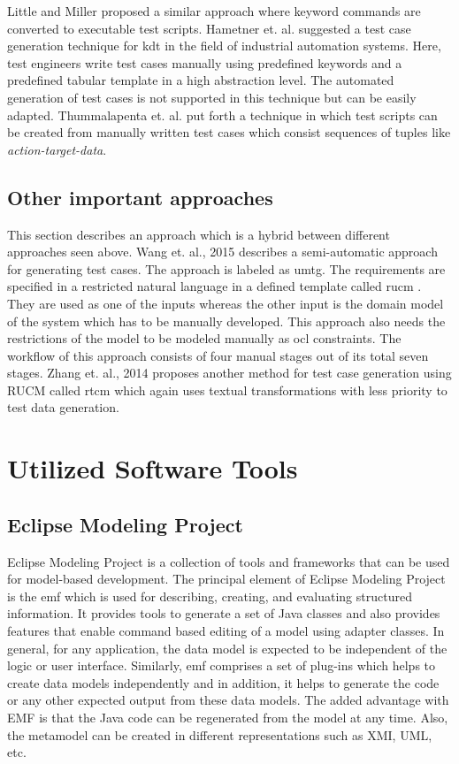 Little and Miller \cite{little2006translating} proposed a similar approach where keyword commands are converted to executable test scripts. Hametner et. al. \cite{hametner2012agile} suggested a test case generation technique for \gls{kdt} in the field of industrial automation systems. Here, test engineers write test cases manually using predefined keywords and a predefined tabular template in a high abstraction level. The automated generation of test cases is not supported in this technique but can be easily adapted. Thummalapenta et. al. \cite{thummalapenta2012automating} put forth a technique in which test scripts can be created from manually written test cases which consist sequences of tuples like \textit{action-target-data}.


\subsection{Other important approaches}
This section describes an approach which is a hybrid between different approaches seen above. Wang et. al., 2015 \cite{wang2015automatic} describes a semi-automatic approach for generating test cases. The approach is labeled as \gls{umtg}. The requirements are specified in a restricted natural language in a defined template called \gls{rucm} \cite{yue2015rtcm}. They are used as one of the inputs whereas the other input is the domain model of the system which has to be manually developed. This approach also needs the restrictions of the model to be modeled manually as \gls{ocl} constraints. The workflow of this approach consists of four manual stages out of its total seven stages. Zhang et. al., 2014 \cite{yue2015rtcm} proposes another method for test case generation using RUCM called \gls{rtcm} which again uses textual transformations with less priority to test data generation. 

\section{Utilized Software Tools}

\subsection{Eclipse Modeling Project}
Eclipse Modeling Project \cite{eclipse} is a collection of tools and frameworks that can be used for model-based development. The principal element of Eclipse Modeling Project is the \gls{emf} which is used for describing, creating, and evaluating structured information. It provides tools to generate a set of Java classes and also provides features that enable command based editing of a model using adapter classes. In general, for any application, the data model is expected to be independent of the logic or user interface. Similarly, \gls{emf} comprises a set of plug-ins which helps to create data models independently and in addition, it helps to generate the code or any other expected output from these data models. The added advantage with EMF is that the Java code can be regenerated from the model at any time. Also, the metamodel can be created in different representations such as XMI, UML, etc. 

